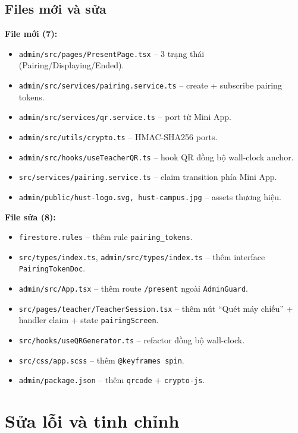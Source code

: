 \documentclass{article}
\begin{document}
\subsection{Files mới và sửa}

\textbf{File mới (7):}

\begin{itemize}[leftmargin=1.5em]
  \item \texttt{admin/src/pages/PresentPage.tsx} -- 3 trạng thái (Pairing/Displaying/Ended).
  \item \texttt{admin/src/services/pairing.service.ts} -- create + subscribe pairing tokens.
  \item \texttt{admin/src/services/qr.service.ts} -- port từ Mini App.
  \item \texttt{admin/src/utils/crypto.ts} -- HMAC-SHA256 ports.
  \item \texttt{admin/src/hooks/useTeacherQR.ts} -- hook QR đồng bộ wall-clock anchor.
  \item \texttt{src/services/pairing.service.ts} -- claim transition phía Mini App.
  \item \texttt{admin/public/hust-logo.svg, hust-campus.jpg} -- assets thương hiệu.
\end{itemize}

\textbf{File sửa (8):}

\begin{itemize}[leftmargin=1.5em]
  \item \texttt{firestore.rules} -- thêm rule \texttt{pairing\_tokens}.
  \item \texttt{src/types/index.ts}, \texttt{admin/src/types/index.ts} -- thêm interface \texttt{PairingTokenDoc}.
  \item \texttt{admin/src/App.tsx} -- thêm route \texttt{/present} ngoài \texttt{AdminGuard}.
  \item \texttt{src/pages/teacher/TeacherSession.tsx} -- thêm nút ``Quét máy chiếu'' + handler claim + state \texttt{pairingScreen}.
  \item \texttt{src/hooks/useQRGenerator.ts} -- refactor đồng bộ wall-clock.
  \item \texttt{src/css/app.scss} -- thêm \texttt{@keyframes spin}.
  \item \texttt{admin/package.json} -- thêm \texttt{qrcode} + \texttt{crypto-js}.
\end{itemize}

\section{Sửa lỗi và tinh chỉnh}
\end{document}
